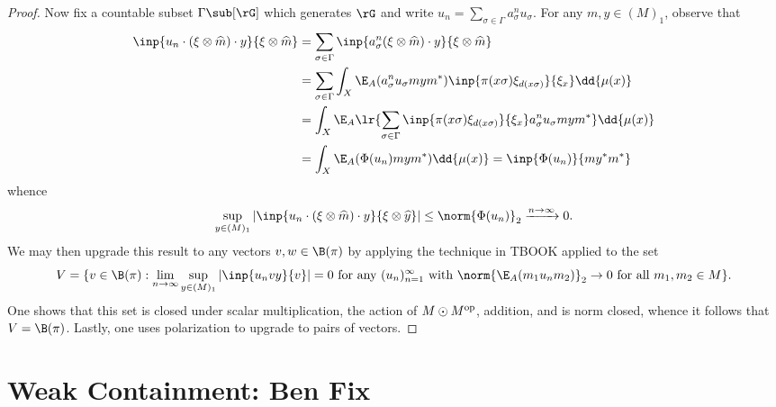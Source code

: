 \documentclass[12pt]{article}
\begin{document}
\begin{proof}
    Now fix a countable subset $ \Gamma \sub [\rG]$ which generates $ \rG $ and write $ u_{n} = \sum_{\sigma\in \Gamma} a_{\sigma}^{n} u_{\sigma} $. For any $ m, y\in (M)_{1} $, observe that
    \begin{align*}
      \inp{u_{n}\cdot( \xi \otimes \widehat{m})\cdot y}{\xi \otimes \widehat{m}}&= \sum_{\sigma\in \Gamma} \inp{a_{\sigma}^{n}( \xi \otimes \widehat{m}) \cdot y}{\xi \otimes \widehat{m}} \\
      &= \sum_{\sigma\in \Gamma} \int_{X} \E_{A} (a_{\sigma}^{n}u_{\sigma}mym^{*}) \inp{\pi(x \sigma) \xi_{d(x \sigma)}}{\xi_{x}} \dd{\mu(x)}\\
      &= \int_{X}\E_{A} \lr{ \sum_{\sigma\in \Gamma}\inp{\pi(x \sigma) \xi_{d(x \sigma)}}{\xi_{x}}a_{\sigma}^{n}u_{\sigma}mym^{*}}  \dd{\mu(x)}\\
      &= \int_{X}\E_{A}(  \Phi(u_{n})mym^{*})  \dd{\mu(x)} = \inp{\Phi(u_{n})}{my^{*}m^{*}}
    \end{align*}
    whence
    \[
      \sup_{y\in (M)_{1}} |\inp{u_{n}\cdot( \xi \otimes \widehat{m})\cdot y}{\xi \otimes \widehat{y}}| \leq \norm{\Phi(u_{n})}_{2} \xrightarrow{n\to\infty} 0.
    \]
    We may then upgrade this result to any vectors $ v,w\in \B(\pi) $ by applying the technique in TBOOK applied to the set 
    \[
      V = \{v\in \B(\pi): \lim_{n\to\infty}\sup_{y\in (M)_{1}} |\inp{u_{n}vy}{v}|=0\text{ for any } (u_{n})_{n=1}^{\infty}\text{ with } \norm{\E_{A}(m_{1}u_{n}m_{2})}_{2}\to 0 \text{ for all }m_{1},m_{2}\in M\}.
    \]
    One shows that this set is closed under scalar multiplication, the action of $ M \odot M^{\rm{op}} $, addition, and is norm closed, whence it follows that $ V = \B(\pi) $. Lastly, one uses polarization to upgrade to pairs of vectors.



\end{proof}




\section{Weak Containment: Ben Fix}
\end{document}
